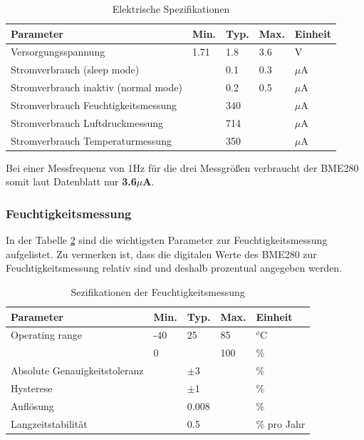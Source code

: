 \begin{table}[h]
  \centering
  \caption{Elektrische Spezifikationen \cite{Bosch2019}}
    \begin{tabular}{lllll}
    \toprule
    \textbf{Parameter} & \textbf{Min.} & \textbf{Typ.} & \textbf{Max.} & \textbf{Einheit} \\
    \midrule
    Versorgungsspannung & 1.71  & 1.8   & 3.6   & V \\
    Stromverbrauch (sleep mode) &       & 0.1   & 0.3   & $\mu$A \\
    Stromverbrauch inaktiv (normal mode) &       & 0.2   & 0.5   & $\mu$A \\
    Stromverbrauch Feuchtigkeitsmessung &       & 340   &       & $\mu$A \\
    Stromverbrauch Luftdruckmessung &       & 714   &       & $\mu$A \\
    Stromverbrauch Temperaturmessung &       & 350   &       & $\mu$A \\
    \bottomrule
    \end{tabular}%
  \label{tab:elektrische_Spezifikationen}%
\end{table}%

Bei einer Messfrequenz von 1Hz für die drei Messgrößen verbraucht der BME280 somit laut Datenblatt nur \textbf{3.6$\mu$A}. \cite[S. 2]{Bosch2019}

\subsubsection*{Feuchtigkeitsmessung}
In der Tabelle \ref{tab:spez_feuchtigkeit} sind die wichtigsten Parameter zur Feuchtigkeitsmessung aufgelistet. Zu vermerken ist, dass die digitalen Werte des BME280 zur Feuchtigkeitsmessung relativ sind und deshalb prozentual angegeben werden. \\
\begin{table}[htbp]
  \centering
  \caption{Sezifikationen der Feuchtigkeitsmessung \cite{Bosch2019}}
    \begin{tabular}{lllll}
    \toprule
     \textbf{Parameter} & \textbf{Min.} & \textbf{Typ.} & \textbf{Max.} & \textbf{Einheit} \\
    \midrule
    Operating range & -40   & 25    & 85    & $^{o}$C \\
          & 0     &       & 100   & \% \\
    Absolute Genauigkeitstoleranz &       & $\pm$3 &       & \% \\
    Hysterese &       & $\pm$1 &       & \% \\
    Auflösung &       & 0.008 &       & \% \\
    Langzeitstabilität &       & 0.5   &       & \% pro Jahr \\
    \bottomrule
    \end{tabular}%
  \label{tab:spez_feuchtigkeit}%
\end{table}%

